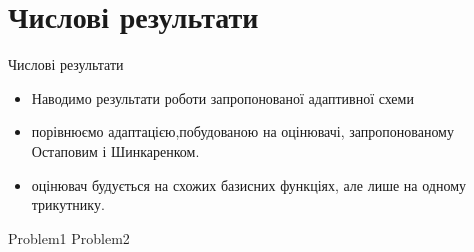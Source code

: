 
\section{Числові результати}

\frame{\sectionpage}
\begin{frame}{Числові результати}
	\begin{itemize}
		\item Наводимо результати роботи запропонованої адаптивної схеми
		\item порівнюємо адаптацією,побудованою на оцінювачі, запропонованому Остаповим і Шинкаренком.
		\item оцінювач будується на схожих базисних функціях, але лише на одному трикутнику.
	\end{itemize}
\end{frame}

{Problem1}
{Problem2}
